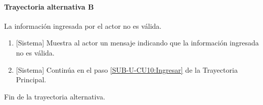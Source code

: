 \paragraph{Trayectoria alternativa B} \label{SUB-U-CU10:TB}
	La información ingresada por el actor no es válida.
	\begin{enumerate}[label=A\arabic*.]
		\item {[Sistema]} Muestra al actor un mensaje indicando que la información ingresada no es válida.
		\item {[Sistema]} Continúa en el paso \ref{SUB-U-CU10:Ingresar} de la Trayectoria Principal.
	\end{enumerate}
	Fin de la trayectoria alternativa.

